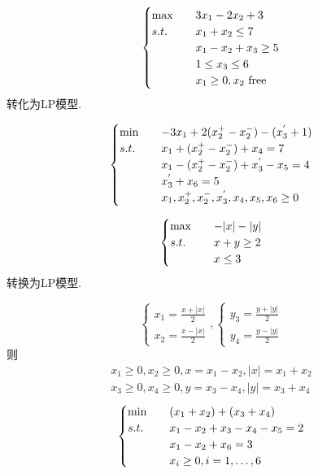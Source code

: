 \begin{example}
    \[
        \begin{cases}
            \max \quad &3x_1 - 2x_2 + 3\\
            s.t. \quad &x_1 + x_2 \le 7\\
            &x_1 - x_2 + x_3 \ge 5\\
            &1 \le x_3 \le 6\\
            &x_1 \ge 0, x_2 \text{ free}
        \end{cases}  
    \]
    转化为LP模型.

    \answer
    \[
        \begin{cases}
            \min \quad &-3x_1 + 2(x_2^{+} - x_2^{-}) - (x_3^{'} + 1)\\
            s.t. \quad &x_1 + (x_2^{+} - x_2^{-}) + x_4 = 7\\
            &x_1 - (x_2^{+} - x_2^{-}) + x_3^{'} - x_5 = 4\\
            &x_3^{'} + x_6 = 5\\
            &x_1, x_2^{+}, x_2^{-}, x_3^{'}, x_4, x_5, x_6 \ge 0
        \end{cases}    
    \]
\end{example}

\begin{example}
    \[
        \begin{cases}
            \max \quad &-|x| - |y|\\
            s.t. \quad &x + y \ge 2\\
            &x \le 3
        \end{cases}  
    \]
    转换为LP模型.

    \answer
    \[
        \begin{cases}
            x_1 = \frac{x + |x|}{2}\\
            x_2 = \frac{x - |x|}{2}
        \end{cases},
        \begin{cases}
            y_3 = \frac{y + |y|}{2}\\
            y_4 = \frac{y - |y|}{2}
        \end{cases}
    \]
    则 
    \begin{gather*}
        x_1 \ge 0, x_2 \ge 0, x = x_1 - x_2, |x| = x_1 + x_2\\
        x_3 \ge 0, x_4 \ge 0, y = x_3 - x_4, |y| = x_3 + x_4
    \end{gather*}
    \[
        \begin{cases}
            \min \quad &(x_1 + x_2) + (x_3 + x_4)\\
            s.t. \quad &x_1 - x_2 + x_3 - x_4 - x_5 = 2\\
            &x_1 - x_2 + x_6 = 3\\
            &x_i \ge 0, i = 1, \dots, 6
        \end{cases}  
    \]
\end{example}

